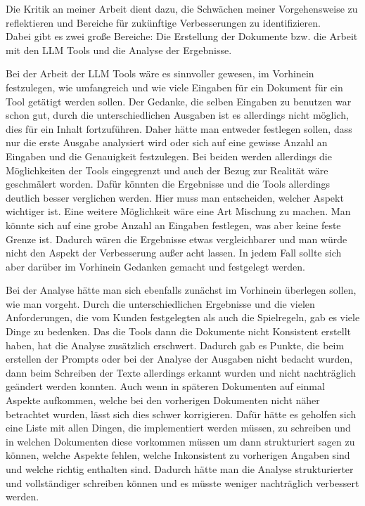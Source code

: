 Die Kritik an meiner Arbeit dient dazu, die Schwächen meiner Vorgehensweise zu reflektieren und Bereiche für zukünftige 
Verbesserungen zu identifizieren.\\
Dabei gibt es zwei große Bereiche: Die Erstellung der Dokumente bzw. die Arbeit mit den LLM Tools und die Analyse der 
Ergebnisse.

Bei der Arbeit der LLM Tools wäre es sinnvoller gewesen, im Vorhinein festzulegen, wie umfangreich und wie viele Eingaben 
für ein Dokument für ein Tool getätigt werden sollen. Der Gedanke, die selben Eingaben zu benutzen war schon gut, durch 
die unterschiedlichen Ausgaben ist es allerdings nicht möglich, dies für ein Inhalt fortzuführen. Daher hätte man 
entweder festlegen sollen, dass nur die erste Ausgabe analysiert wird oder sich auf eine gewisse Anzahl an Eingaben 
und die Genauigkeit festzulegen. Bei beiden werden allerdings die Möglichkeiten der Tools eingegrenzt und auch der 
Bezug zur Realität wäre geschmälert worden. Dafür könnten die Ergebnisse und die Tools allerdings deutlich besser verglichen werden.
Hier muss man entscheiden, welcher Aspekt wichtiger ist. Eine weitere Möglichkeit wäre eine Art Mischung zu machen. 
Man könnte sich auf eine grobe Anzahl an Eingaben festlegen, was aber keine feste Grenze ist. Dadurch wären die Ergebnisse 
etwas vergleichbarer und man würde nicht den Aspekt der Verbesserung außer acht lassen. In jedem Fall sollte sich aber darüber 
im Vorhinein Gedanken gemacht und festgelegt werden. 

Bei der Analyse hätte man sich ebenfalls zunächst im Vorhinein überlegen sollen, wie man vorgeht. Durch die unterschiedlichen
Ergebnisse und die vielen Anforderungen, die vom Kunden festgelegten als auch die Spielregeln, gab es viele Dinge zu bedenken.
Das die Tools dann die Dokumente nicht Konsistent erstellt haben, hat die Analyse zusätzlich erschwert. Dadurch gab es Punkte, die 
beim erstellen der Prompts oder bei der Analyse der Ausgaben nicht bedacht wurden, dann beim Schreiben der Texte allerdings erkannt wurden
und nicht nachträglich geändert werden konnten. Auch wenn in späteren Dokumenten auf einmal Aspekte aufkommen, welche bei den 
vorherigen Dokumenten nicht näher betrachtet wurden, lässt sich dies schwer korrigieren. Dafür hätte es geholfen sich eine 
Liste mit allen Dingen, die implementiert werden müssen, zu schreiben und in welchen Dokumenten diese vorkommen müssen um dann 
strukturiert sagen zu können, welche Aspekte fehlen, welche Inkonsistent zu vorherigen Angaben sind und welche richtig enthalten 
sind. Dadurch hätte man die Analyse strukturierter und vollständiger schreiben können und es müsste weniger nachträglich verbessert werden.

